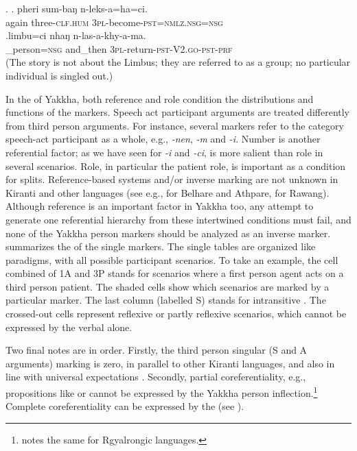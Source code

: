 \ex. \ag.           pheri sum-baŋ       n-leks-a=ha=ci.\\
again three{\scshape -clf.hum} {\scshape 3pl-}become{\scshape -pst=nmlz.nsg=nsg}\\
 
\bg.limbu=ci nhaŋ n-las-a-khy-a-ma.\\
\_person{\scshape =nsg} and\_then {\scshape 3pl-}return{\scshape -pst-V2.go-pst-prf}\\
 (The story is not about the Limbus; they are referred to as  a group; no particular individual is singled out.) 


In the  of Yakkha, both reference and role condition the distributions and functions of the markers. Speech act participant arguments are treated differently from third person arguments. For instance, several markers refer to the category speech-act participant as a whole, e.g., \emph{-nen}, \emph{-m} and \emph{-i}. Number is another referential factor; as we have seen for \emph{-i} and \emph{-ci},  is more salient than role in several scenarios. Role, in particular the patient role, is important as a condition for  splits. 
Reference-based systems and/or inverse marking are not unknown in Kiranti and other  languages  (see e.g., \citet{Ebert1991Inverse} for Belhare and Athpare, \citet{LaPolla2007Hierarchical} for Rawang). Although reference is an important factor in Yakkha too, any attempt to generate one referential hierarchy from these intertwined conditions must  fail, and none of the Yakkha person markers should be analyzed as an inverse marker.  summarizes  the  of the single markers. The single tables are organized like paradigms, with all possible participant scenarios. To take an example, the cell combined of 1A and 3P stands for scenarios where a first person agent acts on a third person patient. The shaded cells show which  scenarios are marked by a particular marker. The last column (labelled S) stands for intransitive . The crossed-out cells represent reflexive or partly reflexive scenarios, which cannot be expressed by the verbal  alone.

Two final notes are in order. Firstly, the third person singular (S and A arguments) marking is zero, in parallel to other Kiranti languages, and also in line with universal expectations \citep{Siewierska2008_Person}. Secondly, partial coreferentiality, e.g., propositions like  or  cannot be expressed by the Yakkha person inflection.\footnote{\citet{Jacques2012_Agreement} notes the same for Rgyalrongic languages.}  Complete coreferentiality can be expressed by the   (see  ).

